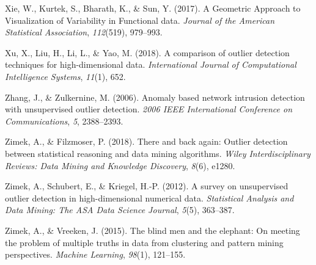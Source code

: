 \documentclass[
  10pt]{article}
\newlength{\cslhangindent}
\newlength{\cslentryspacingunit} %
\newenvironment{CSLReferences}[2] %
 {%
  \setlength{\parindent}{0pt}
  \ifodd #1
  \let\oldpar\par
  \def\par{\hangindent=\cslhangindent\oldpar}
  \fi
  \setlength{\parskip}{#2\cslentryspacingunit}
 }%
 {}
\begin{document}
\begin{CSLReferences}{1}{0}
\leavevmode{}%
Xie, W., Kurtek, S., Bharath, K., \& Sun, Y. (2017). A {G}eometric {A}pproach to {V}isualization of {V}ariability in {F}unctional data. \emph{Journal of the American Statistical Association}, \emph{112}(519), 979--993.

\leavevmode{}%
Xu, X., Liu, H., Li, L., \& Yao, M. (2018). A comparison of outlier detection techniques for high-dimensional data. \emph{International Journal of Computational Intelligence Systems}, \emph{11}(1), 652.

\leavevmode{}%
Zhang, J., \& Zulkernine, M. (2006). Anomaly based network intrusion detection with unsupervised outlier detection. \emph{2006 IEEE International Conference on Communications}, \emph{5}, 2388--2393.

\leavevmode{}%
Zimek, A., \& Filzmoser, P. (2018). There and back again: Outlier detection between statistical reasoning and data mining algorithms. \emph{Wiley Interdisciplinary Reviews: Data Mining and Knowledge Discovery}, \emph{8}(6), e1280.

\leavevmode{}%
Zimek, A., Schubert, E., \& Kriegel, H.-P. (2012). A survey on unsupervised outlier detection in high-dimensional numerical data. \emph{Statistical Analysis and Data Mining: The ASA Data Science Journal}, \emph{5}(5), 363--387.

\leavevmode{}%
Zimek, A., \& Vreeken, J. (2015). The blind men and the elephant: On meeting the problem of multiple truths in data from clustering and pattern mining perspectives. \emph{Machine Learning}, \emph{98}(1), 121--155.

\end{CSLReferences}
\end{document}
